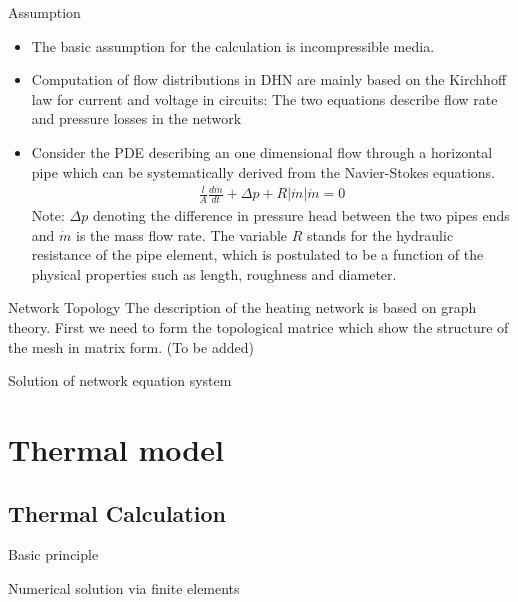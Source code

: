 \documentclass[xcolor=dvipsnames]{beamer}
\begin{document}
{\begin{frame}{Assumption}
\begin{itemize}
	\item 	The basic assumption for the calculation is incompressible media.
	\item 	Computation of flow distributions in DHN are mainly based on the Kirchhoff law for {\color{red}current} and {\color{blue}voltage} in circuits: The two equations describe {\color{red}flow rate} and {\color{blue}pressure losses} in the network
	\item 	Consider the PDE describing an one dimensional flow through a horizontal pipe which can be systematically derived from the Navier-Stokes equations.
\begin{align}
	\frac{l}{A}\frac{d\dot{m}}{dt}+\Delta p+R|\dot{m}|\dot{m}=0
\end{align}
Note: $\Delta p$ denoting the difference in pressure head between the two pipes ends and $\dot{m}$ is the mass flow rate. The variable $R$ stands for the hydraulic resistance of the pipe element, which is postulated to be a function of the physical properties such as length, roughness and diameter.
\end{itemize}
\end{frame}

\begin{frame}{Network Topology}
The description of the heating network is based on graph theory. First we need to form the topological matrice which show the structure of the mesh in matrix form. (To be added)


\end{frame}

\begin{frame}{Solution of network equation system}

\end{frame}
}

\section{Thermal model}

\subsection{Thermal Calculation}

\begin{frame}{Basic principle}
	
\end{frame}

\begin{frame}{Numerical solution via finite elements}
	
\end{frame}
\end{document}
